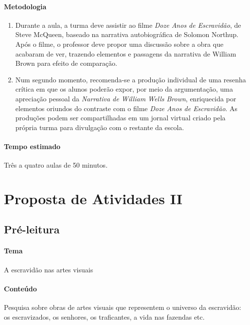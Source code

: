 \documentclass[12pt]{extarticle}
\begin{document}
 \paragraph{Metodologia}
   \begin{enumerate}
    \item 
    Durante a aula, a turma deve assistir ao filme \emph{Doze Anos de Escravidão},
    de Steve McQueen, baseado na narrativa autobiográfica de Solomon Northup. 
    Após o filme, o professor deve propor uma discussão sobre a obra que acabaram de 
    ver, trazendo elementos e passagens da narrativa de William Brown 
    para efeito de comparação.

  \item
   Num segundo momento, recomenda-se a produção individual de uma
resenha crítica em que os
alunos poderão expor, por meio da argumentação, uma apreciação
pessoal da \emph{Narrativa de William Wells Brown}, enriquecida por
elementos oriundos do contraste com o filme \emph{Doze Anos de Escravidão}.
As produções podem ser compartilhadas em um jornal virtual criado 
pela própria turma para divulgação com o restante da escola.
   \end{enumerate}

 \paragraph{Tempo estimado} Três a quatro aulas de 50 minutos.


\section{Proposta de Atividades II}

\subsection{Pré-leitura}

 \paragraph{Tema} A escravidão nas artes visuais

 \paragraph{Conteúdo} Pesquisa sobre obras de artes visuais que representem 
 o universo da escravidão: os escravizados, os senhores, os traficantes,
 a vida nas fazendas etc.
\end{document}
